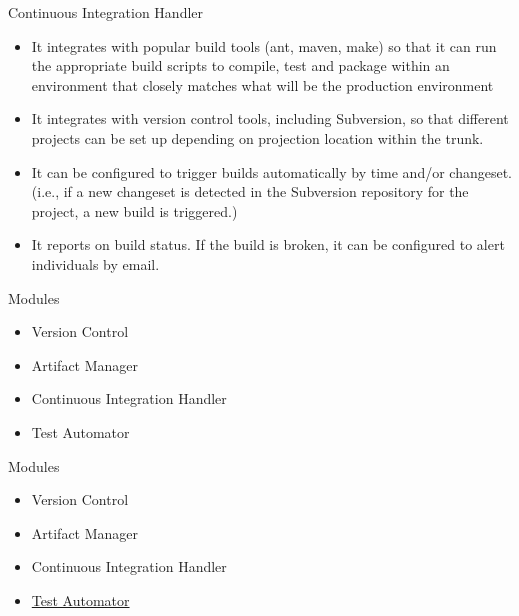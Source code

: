 \documentclass{beamer}
\begin{document}
\begin{frame}{Continuous Integration Handler}
\begin{itemize}
\item  It integrates with popular build tools (ant, maven, make) so that it can run the appropriate
build scripts to compile, test and package within an environment that closely
matches what will be the production environment
\item It integrates with version control tools, including Subversion, so that different projects
can be set up depending on projection location within the trunk.
\item It can be configured to trigger builds automatically by time and/or changeset. (i.e.,
if a new changeset is detected in the Subversion repository for the project, a new
build is triggered.)
\item It reports on build status. If the build is broken, it can be configured to alert individuals
by email.
\end{itemize}
\end{frame}



\begin{frame}{Modules}
\begin{itemize}
\item Version Control
\item Artifact Manager
\item Continuous Integration Handler
\item Test Automator

\end{itemize}

\end{frame}

\begin{frame}{Modules}
\begin{itemize}
\item Version Control
\item Artifact Manager
\item Continuous Integration Handler
\item \underline{Test Automator}

\end{itemize}

\end{frame}
\end{document}
